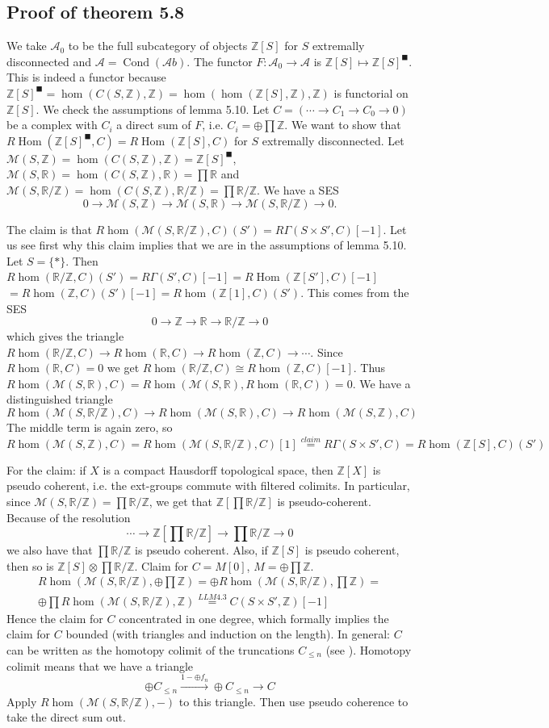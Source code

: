 \documentclass[12pt]{article}
\theoremstyle{darkgreentheorem}
\theoremstyle{darkbluedefinition}
\theoremstyle{darkredexample}
\theoremstyle{remark}
\newcommand{\Z}{\mathbb{Z}}
\newcommand{\R}{\mathbb{R}}
\newcommand{\1}{\mathbbm{1}}
\newcommand{\A}{\mathscr{A}}
\newcommand{\Ab}{\mathscr{A}b}
\newcommand{\M}{\mathcal{M}}
\DeclareMathOperator{\Hom}{Hom}
\DeclareMathOperator{\Cond}{Cond}
\newcommand{\ot}{\otimes}
\newcommand{\op}{\oplus}
\newcommand{\tms}{\times}
\newcommand{\solid}{^{\blacksquare}}
\begin{document}
\subsection{Proof of theorem 5.8}

We take $\A_{0}$ to be the full subcategory of objects $\Z[S]$ for $S$ extremally disconnected and $\A=\Cond(\Ab)$.
The functor $F\colon \A_{0}\to \A$ is $\Z[S]\mapsto \Z[S]\solid$.
This is indeed a functor because $\Z[S]\solid=\hom(C(S,\Z),\Z)=\hom(\hom(\Z[S],\Z),\Z)$ is functorial on $\Z[S]$.
We check the assumptions of lemma 5.10.
Let $C=(\cdots \to C_{1}\to C_{0}\to 0)$ be a complex with $C_{i}$ a direct sum of $F$, i.e. $C_{i}=\op \prod \Z$.
We want to show that $R\Hom(\Z[S]\solid,C)=R\Hom(\Z[S],C)$ for $S$ extremally disconnected.
Let $\M(S,\Z)=\hom(C(S,\Z),\Z)=\Z[S]\solid$, $\M(S,\R)=\hom(C(S,\Z),\R)=\prod \R$ and $\M(S,\R/\Z)=\hom(C(S,\Z),\R/\Z)=\prod \R/\Z$.
We have a SES
\[ 0\to \M(S,\Z)\to \M(S,\R)\to \M(S,\R/\Z)\to 0.\]

The claim is that $R\hom(\M(S,\R/\Z),C)(S')=R\Gamma (S\tms S',C)[-1]$.
Let us see first why this claim implies that we are in the assumptions of lemma 5.10.
Let $S=\{*\}$.
Then $R\hom(\R/\Z,C)(S')=R\Gamma(S',C)[-1]=R\Hom(\Z[S'],C)[-1]$$=R\hom(\Z,C)(S')[-1]=R\hom(\Z[1],C)(S')$.
This comes from the SES
\[ 0\to \Z\to \R\to \R/\Z\to 0 \]
which gives the triangle $R\hom(\R/\Z,C)\to R\hom(\R,C)\to R\hom(\Z,C)\to \cdots$.
Since $R\hom(\R,C)=0$ we get $R\hom(\R/\Z,C)\cong R\hom(\Z,C)[-1]$.
Thus $R\hom(\M(S,\R),C)=R\hom(\M(S,\R),R\hom(\R,C))=0$.
We have a distinguished triangle
\[ R\hom(\M(S,\R/\Z),C)\to R\hom(\M(S,\R),C)\to R\hom(\M(S,\Z),C) \]
The middle term is again zero, so
\[ R\hom(\M(S,\Z),C)=R\hom(\M(S,\R/\Z),C)[1]\overset{claim}{=} R\Gamma(S\tms S',C)=R\hom(\Z[S],C)(S')\]

For the claim: if $X$ is a compact Hausdorff topological space, then $\Z[X]$ is pseudo coherent, i.e. the ext-groups commute with filtered colimits.
In particular, since $\M(S,\R/\Z)=\prod \R/\Z$, we get that $\Z[\prod \R/\Z]$ is pseudo-coherent.
Because of the resolution
\[ \cdots \to \Z[\prod \R/\Z]\to \prod \R/\Z\to 0\]
we also have that $\prod \R/\Z$ is pseudo coherent.
Also, if $\Z[S]$ is pseudo coherent, then so is $\Z[S]\ot \prod \R/\Z$.
Claim for $C=M[0]$, $M=\op \prod \Z$.
\begin{multline*}
    R\hom(\M(S,\R/\Z),\op \prod \Z)=\op R\hom(\M(S,\R/\Z),\prod \Z) =\\
    \op \prod R\hom(\M(S,\R/\Z),\Z) \overset{LLM 4.3}{=} C(S\tms S',\Z)[-1]
\end{multline*}
Hence the claim for $C$ concentrated in one degree, which formally implies the claim for $C$ bounded (with triangles and induction on the length).
In general: $C$ can be written as the homotopy colimit of the truncations $C_{\leqslant n}$ (see \cite[Tag 093W]{sta19}).
Homotopy colimit means that we have a triangle
\[ \op C_{\leqslant n} \xrightarrow{1-\op f_{n}}\op C_{\leqslant n}\to C \]
Apply $R\hom(\M(S,\R/\Z),-)$ to this triangle.
Then use pseudo coherence to take the direct sum out.
\end{document}
